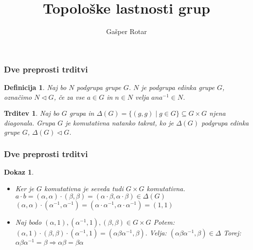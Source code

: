 \documentclass{beamer}
\title{Topološke lastnosti grup}
\author{Gašper Rotar}
\institute{Fakulteta za matematiko in fiziko}
\newtheorem{trditev}{Trditev}
\newtheorem{definicija}{Definicija}
\newtheorem{dokaz}{Dokaz}
\begin{document}

\begin{frame}
\titlepage
\end{frame}


\begin{frame}
\frametitle{Dve preprosti trditvi}

\begin{definicija}
    Naj bo $N$ podgrupa grupe $G$. $N$ je podgrupa \emph{edinka} grupe $G$, označimo $N \triangleleft G$, če za vse $a \in G$ in $n \in N$ velja $ana^{-1} \in N$.
\end{definicija}

\pause

\begin{trditev}
    Naj bo $G$ grupa in $\Delta(G) = \{(g,g) \mid g \in G \} \subseteq G \times G$ njena diagonala.
    Grupa $G$ je komutativna natanko takrat, ko je $\Delta(G)$ podgrupa edinka grupe $G$, $\Delta(G) \triangleleft G$.
\end{trditev}

\end{frame}

\begin{frame}
\frametitle{Dve preprosti trditvi}

\begin{dokaz}
    \begin{itemize}
        \item[($\Rightarrow$)]
            Ker je $G$ komutativna je seveda tudi $G \times G$ komutativna.
            \pause
            $a \cdot b = (\alpha, \alpha) \cdot (\beta, \beta) = (\alpha \cdot \beta, \alpha \cdot \beta) \in \Delta(G)$
            \pause
            $(\alpha, \alpha) \cdot (\alpha^{-1}, \alpha^{-1}) = (\alpha \cdot \alpha^{-1}, \alpha \cdot \alpha^{-1}) = (1,1)$
            \pause
            \bigskip
        \item[($\Leftarrow$)]
            Naj bodo $(\alpha,1), (\alpha^{-1}, 1), (\beta, \beta) \in G \times G$
            \newline
            \pause
            Potem: $(\alpha,1) \cdot (\beta, \beta) \cdot (\alpha^{-1}, 1) = (\alpha\beta\alpha^{-1}, \beta).$
            \newline
            \pause
            Velja: $(\alpha\beta\alpha^{-1}, \beta) \in \Delta$
            \newline
            \pause
            Torej:$\alpha\beta\alpha^{-1} = \beta \Rightarrow \alpha\beta = \beta\alpha$
    \end{itemize}
\end{dokaz}

\end{frame}
\end{document}

